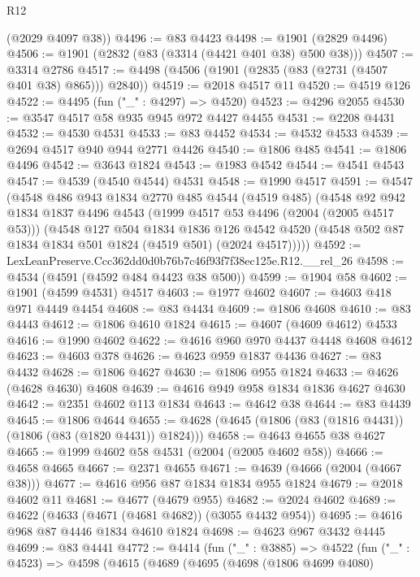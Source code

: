 \begin{lexlean}{R12}
\begin{coremodule}
      (@2029 @4097 @38))
@4496 := @83 @4423
@4498 := @1901 (@2829 @4496)
@4506 := @1901 (@2832 (@83 (@3314 (@4421 @401 @38) @500 @38)))
@4507 := @3314 @2786
@4517 := @4498 (@4506 (@1901 (@2835 (@83 (@2731 (@4507 @401 @38) @865))) @2840))
@4519 := @2018 @4517 @11
@4520 := @4519 @126
@4522 := @4495 (fun ("_" : @4297) => @4520)
@4523 := @4296 @2055
@4530 := @3547 @4517 @58 @935 @945 @972 @4427 @4455
@4531 := @2208 @4431
@4532 := @4530 @4531
@4533 := @83 @4452
@4534 := @4532 @4533
@4539 := @2694 @4517 @940 @944 @2771 @4426
@4540 := @1806 @485
@4541 := @1806 @4496
@4542 := @3643 @1824
@4543 := @1983 @4542
@4544 := @4541 @4543
@4547 := @4539 (@4540 @4544) @4531
@4548 := @1990 @4517
@4591 := @4547
    (@4548
      @486
      @943
      @1834
      @2770
      @485
      @4544
      (@4519 @485)
      (@4548
        @92
        @942
        @1834
        @1837
        @4496
        @4543
        (@1999 @4517 @53 @4496 (@2004 (@2005 @4517 @53)))
        (@4548
          @127
          @504
          @1834
          @1836
          @126
          @4542
          @4520
          (@4548 @502 @87 @1834 @1834 @501 @1824 (@4519 @501) (@2024 @4517)))))
@4592 := LexLeanPreserve.Ccc362dd0d0b76b7c46f93f7f38ec125e.R12.__rel_26
@4598 := @4534 (@4591 (@4592 @484 @4423 @38 @500))
@4599 := @1904 @58
@4602 := @1901 (@4599 @4531) @4517
@4603 := @1977 @4602
@4607 := @4603 @418 @971 @4449 @4454
@4608 := @83 @4434
@4609 := @1806 @4608
@4610 := @83 @4443
@4612 := @1806 @4610 @1824
@4615 := @4607 (@4609 @4612) @4533
@4616 := @1990 @4602
@4622 := @4616 @960 @970 @4437 @4448 @4608 @4612
@4623 := @4603 @378
@4626 := @4623 @959 @1837 @4436
@4627 := @83 @4432
@4628 := @1806 @4627
@4630 := @1806 @955 @1824
@4633 := @4626 (@4628 @4630) @4608
@4639 := @4616 @949 @958 @1834 @1836 @4627 @4630
@4642 := @2351 @4602 @113 @1834
@4643 := @4642 @38
@4644 := @83 @4439
@4645 := @1806 @4644
@4655 := @4628 (@4645 (@1806 (@83 (@1816 @4431)) (@1806 (@83 (@1820 @4431)) @1824)))
@4658 := @4643 @4655 @38 @4627
@4665 := @1999 @4602 @58 @4531 (@2004 (@2005 @4602 @58))
@4666 := @4658 @4665
@4667 := @2371 @4655
@4671 := @4639 (@4666 (@2004 (@4667 @38)))
@4677 := @4616 @956 @87 @1834 @1834 @955 @1824
@4679 := @2018 @4602 @11
@4681 := @4677 (@4679 @955)
@4682 := @2024 @4602
@4689 := @4622 (@4633 (@4671 (@4681 @4682)) (@3055 @4432 @954))
@4695 := @4616 @968 @87 @4446 @1834 @4610 @1824
@4698 := @4623 @967 @3432 @4445
@4699 := @83 @4441
@4772 := @4414
    (fun ("_" : @3885) =>
    @4522
      (fun ("_" : @4523) =>
      @4598
        (@4615
          (@4689
            (@4695
              (@4698
                (@1806 @4699 @4080)

\end{coremodule}
\end{lexlean}
